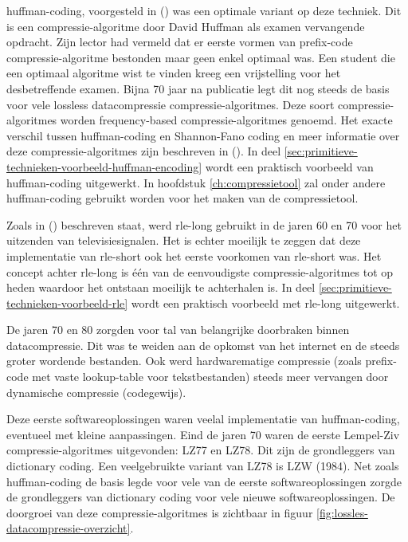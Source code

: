 \Gls{huffman-coding}, voorgesteld in   (\cite{huffman}) was een optimale variant op deze techniek. Dit is een \gls{compressie-algoritme} door David Huffman als examen vervangende opdracht. Zijn lector had vermeld dat er eerste vormen van \gls{prefix-code} \gls{compressie-algoritme} bestonden maar geen enkel optimaal was. Een student die een optimaal algoritme wist te vinden kreeg een vrijstelling voor het desbetreffende examen. Bijna 70 jaar na publicatie legt dit nog steeds de basis voor vele \gls{lossless} \gls{datacompressie} \glspl{compressie-algoritme}. Deze soort \glspl{compressie-algoritme} worden frequency-based \glspl{compressie-algoritme} genoemd. Het exacte verschil tussen \gls{huffman-coding} en Shannon-Fano coding en meer informatie over deze \glspl{compressie-algoritme} zijn beschreven in  (\cite{lelewer87datacompression}). In deel \ref{sec:primitieve-technieken-voorbeeld-huffman-encoding} wordt een praktisch voorbeeld van \gls{huffman-coding} uitgewerkt. In hoofdstuk  \ref{ch:compressietool} zal onder andere \gls{huffman-coding} gebruikt worden voor het maken van de compressietool.

Zoals in  (\cite{robinson1967}) beschreven staat, werd \gls{rle-long} gebruikt in de jaren 60 en 70 voor het uitzenden van televisiesignalen. Het is echter moeilijk te zeggen dat deze implementatie van \gls{rle-short} ook het eerste voorkomen van \gls{rle-short} was. Het concept achter \gls{rle-long} is één van de eenvoudigste \glspl{compressie-algoritme} tot op heden waardoor het ontstaan moeilijk te achterhalen is. In deel \ref{sec:primitieve-technieken-voorbeeld-rle} wordt een praktisch voorbeeld met \gls{rle-long} uitgewerkt.

De jaren 70 en 80 zorgden voor tal van belangrijke doorbraken binnen \gls{datacompressie}. Dit was te weiden aan de opkomst van het internet en de steeds groter wordende bestanden. Ook werd hardwarematige compressie (zoals \gls{prefix-code} met vaste \gls{lookup-table} voor tekstbestanden) steeds meer vervangen door dynamische compressie (codegewijs). 


Deze eerste softwareoplossingen waren veelal implementatie van \gls{huffman-coding}, eventueel met kleine aanpassingen. Eind de jaren 70 waren de eerste Lempel-Ziv \glspl{compressie-algoritme} uitgevonden: LZ77 en LZ78. Dit zijn de grondleggers van dictionary coding. Een veelgebruikte variant van LZ78 is LZW (1984). Net zoals \gls{huffman-coding} de basis legde voor vele van de eerste softwareoplossingen zorgde de grondleggers van dictionary coding voor vele nieuwe softwareoplossingen. De doorgroei van deze \glspl{compressie-algoritme} is zichtbaar in figuur \ref{fig:lossles-datacompressie-overzicht}.


